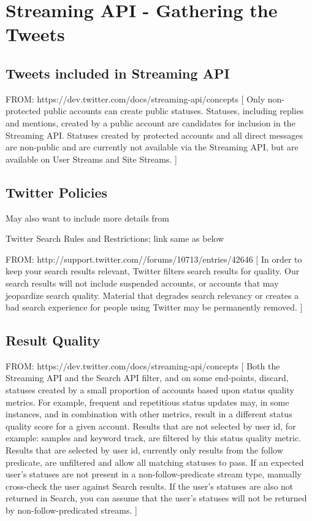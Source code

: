 \documentclass[12pt,a4paper]{report}
\begin{document}
\section{Streaming API - Gathering the Tweets}

\subsection{Tweets included in Streaming API}

FROM: https://dev.twitter.com/docs/streaming-api/concepts
[
Only non-protected public accounts can create public statuses. 
Statuses, including replies and mentions, created by a public 
account are candidates for inclusion in the Streaming API. Statuses 
created by protected accounts and all direct messages are non-public 
and are currently not available via the Streaming API, but are 
available on User Streams and Site Streams.
]

\subsection{Twitter Policies}

May also want to include more details from

Twitter Search Rules and Restrictions; link same as below

FROM: http://support.twitter.com//forums/10713/entries/42646
[
In order to keep your search results relevant, Twitter filters search 
results for quality. Our search results will not include suspended accounts, 
or accounts that may jeopardize search quality. Material that degrades 
search relevancy or creates a bad search experience for 
people using Twitter may be permanently removed.
]
\subsection{Result Quality}

FROM: https://dev.twitter.com/docs/streaming-api/concepts
[
Both the Streaming API and the Search API filter, and on some end-points,
discard, statuses created by a small proportion of accounts based upon status
quality metrics. For example, frequent and repetitious status updates may,
in some instances, and in combination with other metrics, result in a
different status quality score for a given account. Results that are not selected
by user id, for example: samples and keyword track, are filtered by this
status quality metric. Results that are selected by user id, currently only
results from the follow predicate, are unfiltered and allow all
matching statuses to pass. If an expected user's statuses are not present in a
non-follow-predicate stream type, manually cross-check the user against Search
results. If the user's statuses are also not returned in Search, you can assume
that the user's statuses will not be returned by non-follow-predicated streams.
]
\end{document}
